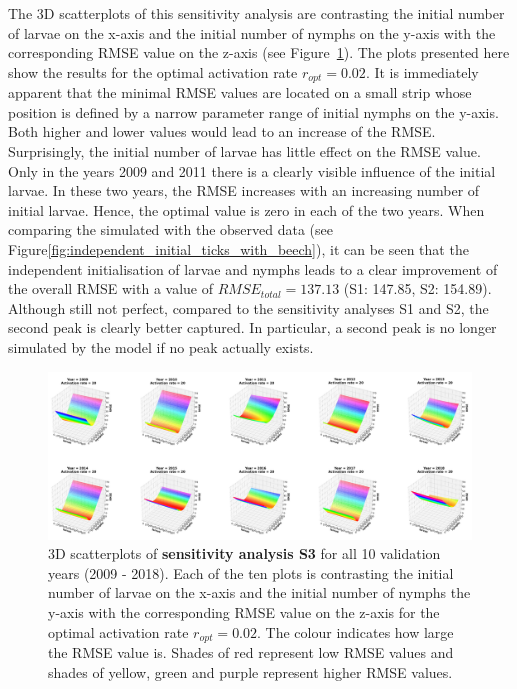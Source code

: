 \documentclass[a4paper, 11pt]{scrartcl}
\begin{document}
The 3D scatterplots of this sensitivity analysis are contrasting the initial number of larvae on the x-axis and the initial number of nymphs on the y-axis with the corresponding
RMSE value on the z-axis (see Figure~\ref{fig:independent_initial_ticks_with_beech_error}). The plots presented here show the results for the optimal activation rate
$r_{opt}= 0.02$. It is immediately apparent that the minimal RMSE values are located on a small strip whose position is defined by a narrow parameter range of initial nymphs on the
y-axis. Both higher and lower values would lead to an increase of the RMSE. Surprisingly, the initial number of larvae has little effect on the RMSE value. Only in the years
2009 and 2011 there is a clearly visible influence of the initial larvae. In these two years, the RMSE increases with an increasing number of initial larvae. Hence, the optimal
value is zero in each of the two years.
When comparing the simulated with the observed data (see Figure\ref{fig:independent_initial_ticks_with_beech}), it can be seen that the independent initialisation of larvae and
nymphs leads to a clear improvement of the overall RMSE with a value of $RMSE_{total} = 137.13$ (S1: 147.85, S2: 154.89). Although still not perfect, compared to the sensitivity
analyses S1 and S2, the second peak is clearly better captured. In particular, a second peak is no longer simulated by the model if no peak actually exists.

\clearpage

\begin{figure}[h!]
\centering
\includegraphics[width=\linewidth]{figures/independent_initial_ticks_with_beech_error}
\caption{3D scatterplots of \textbf{sensitivity analysis S3} for all 10 validation years (2009 - 2018). Each of the ten plots is contrasting the initial number of larvae on the
x-axis and the initial number of nymphs the y-axis with the corresponding RMSE value on the z-axis for the optimal activation rate $r_{opt} = 0.02$. The colour indicates how large
the RMSE value is. Shades of red represent low RMSE values and shades of yellow, green and purple represent higher RMSE values.}
\label{fig:independent_initial_ticks_with_beech_error}
\end{figure}
\end{document}
